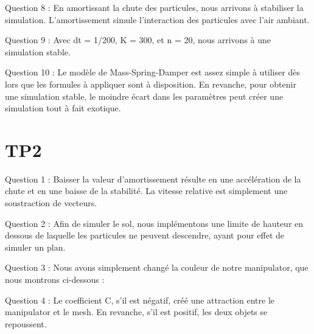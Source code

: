 \documentclass[a4paper,12pt]{article}
\begin{document}
Question 8 : En amortissant la chute des particules, nous arrivons à stabiliser la simulation. L'amortissement simule l'interaction des particules avec l'air ambiant.%

Question 9 : 	Avec dt = 1/200, K = 300, et n = 20, nous arrivons à une simulation stable.

Question 10 : Le modèle de Mass-Spring-Damper est assez simple à utiliser dès lors que les formules à appliquer sont à disposition. En revanche, pour obtenir une simulation stable, le moindre écart dans les paramètres peut créer une simulation tout à fait exotique.

\section{TP2}

Question 1 : Baisser la valeur d'amortissement résulte en une accélération de la chute et en une baisse de la stabilité. La vitesse relative est simplement une soustraction de vecteurs.

Question 2 : Afin de simuler le sol, nous implémentons une limite de hauteur en dessous de laquelle les particules ne peuvent descendre, ayant pour effet de simuler un plan. %


Question 3 : Nous avons simplement changé la couleur de notre manipulator, que nous montrons ci-dessous : %


Question 4 : Le coefficient C, s'il est négatif, créé une attraction entre le manipulator et le mesh. En revanche, s'il est positif, les deux objets se repoussent.
\end{document}
